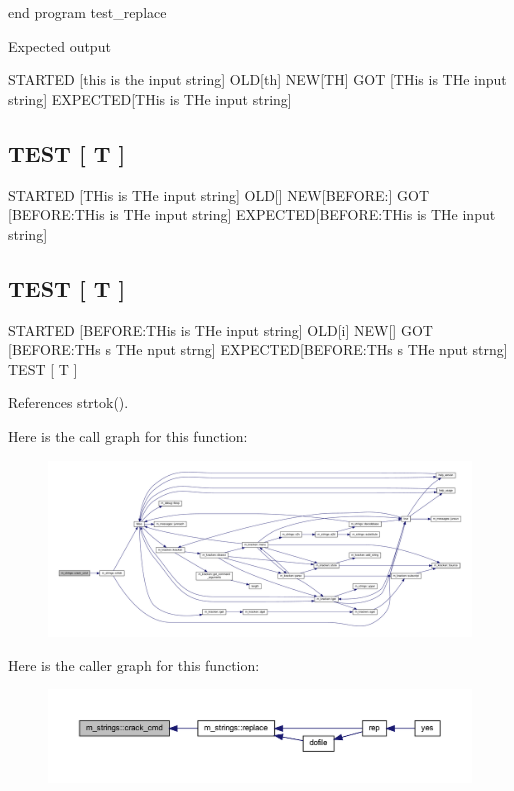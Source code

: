 end program test\+\_\+replace

Expected output 

 S\+T\+A\+R\+T\+ED \mbox{[}this is the input string\mbox{]} O\+LD\mbox{[}th\mbox{]} N\+EW\mbox{[}TH\mbox{]} G\+OT \mbox{[}T\+His is T\+He input string\mbox{]} E\+X\+P\+E\+C\+T\+ED\mbox{[}T\+His is T\+He input string\mbox{]} \subsection*{T\+E\+ST \mbox{[} T \mbox{]} }

S\+T\+A\+R\+T\+ED \mbox{[}T\+His is T\+He input string\mbox{]} O\+LD\mbox{[}\mbox{]} N\+EW\mbox{[}B\+E\+F\+O\+RE\+:\mbox{]} G\+OT \mbox{[}B\+E\+F\+O\+RE\+:T\+His is T\+He input string\mbox{]} E\+X\+P\+E\+C\+T\+ED\mbox{[}B\+E\+F\+O\+RE\+:T\+His is T\+He input string\mbox{]} \subsection*{T\+E\+ST \mbox{[} T \mbox{]} }

S\+T\+A\+R\+T\+ED \mbox{[}B\+E\+F\+O\+RE\+:T\+His is T\+He input string\mbox{]} O\+LD\mbox{[}i\mbox{]} N\+EW\mbox{[}\mbox{]} G\+OT \mbox{[}B\+E\+F\+O\+RE\+:T\+Hs s T\+He nput strng\mbox{]} E\+X\+P\+E\+C\+T\+ED\mbox{[}B\+E\+F\+O\+RE\+:T\+Hs s T\+He nput strng\mbox{]} T\+E\+ST \mbox{[} T \mbox{]} 

References strtok().

Here is the call graph for this function\+:
\nopagebreak
\begin{figure}[H]
\begin{center}
\leavevmode
\includegraphics[width=350pt]{namespacem__strings_a818d715927dd61c1be6df5d2cdec4e4c_cgraph}
\end{center}
\end{figure}
Here is the caller graph for this function\+:
\nopagebreak
\begin{figure}[H]
\begin{center}
\leavevmode
\includegraphics[width=350pt]{namespacem__strings_a818d715927dd61c1be6df5d2cdec4e4c_icgraph}
\end{center}
\end{figure}
\mbox{\label{namespacem__strings_a7030d33ae9e65d8cf2e2cb9332ffdac0}} 

